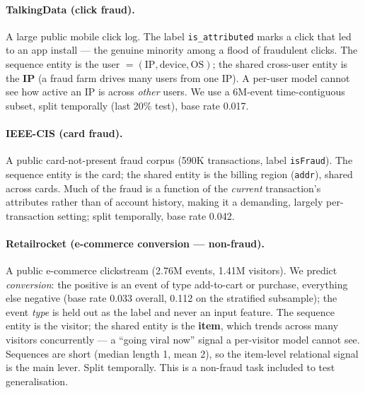 \paragraph{TalkingData (click fraud).} A large public mobile click log. The label
\texttt{is\_attributed} marks a click that led to an app install --- the genuine minority among a
flood of fraudulent clicks. The sequence entity is the user $=(\textrm{IP},\textrm{device},
\textrm{OS})$; the shared cross-user entity is the \textbf{IP} (a fraud farm drives many users from
one IP). A per-user model cannot see how active an IP is across \emph{other} users. We use a
\num{6}M-event time-contiguous subset, split temporally (last \num{20}\% test), base rate \num{0.017}.

\paragraph{IEEE-CIS (card fraud).} A public card-not-present fraud corpus (\num{590}K transactions,
label \texttt{isFraud}). The sequence entity is the card; the shared entity is the billing region
(\texttt{addr}), shared across cards. Much of the fraud is a function of the \emph{current}
transaction's attributes rather than of account history, making it a demanding, largely
per-transaction setting; split temporally, base rate \num{0.042}.

\paragraph{Retailrocket (e-commerce conversion --- non-fraud).} A public e-commerce clickstream
(\num{2.76}M events, \num{1.41}M visitors). We predict \emph{conversion}: the positive is an event
of type add-to-cart or purchase, everything else negative (base rate \num{0.033} overall,
\num{0.112} on the stratified subsample); the event \emph{type} is held out as the label and never
an input feature. The sequence entity is the visitor; the shared entity is the \textbf{item}, which
trends across many visitors concurrently --- a ``going viral now'' signal a per-visitor model cannot
see. Sequences are short (median length \num{1}, mean \num{2}), so the item-level relational signal
is the main lever. Split temporally. This is a non-fraud task included to test generalisation.
